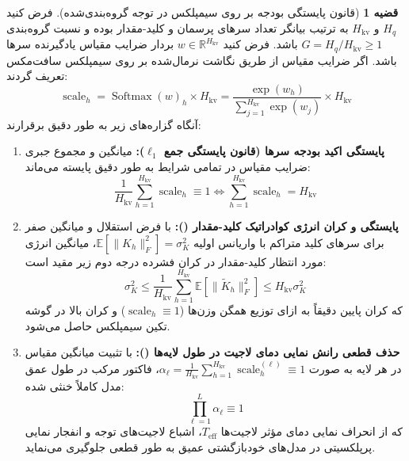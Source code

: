 \documentclass[12pt,a4paper]{report}
\theoremstyle{definition}
\newtheorem{theorem}{قضیه}[chapter]
\begin{document}
\begin{theorem}[قانون پایستگی بودجه بر روی سیمپلکس در توجه گروه‌بندی‌شده]
\label{thm:simplex_conservation_persian}
فرض کنید $H_q$ و $H_{\text{kv}}$ به ترتیب بیانگر تعداد سرهای پرسمان و کلید-مقدار بوده و نسبت گروه‌بندی $G = H_q / H_{\text{kv}} \ge 1$ باشد. فرض کنید $w \in \mathbb{R}^{H_{\text{kv}}}$ بردار ضرایب مقیاس یادگیرنده سرها باشد. اگر ضرایب مقیاس از طریق نگاشت نرمال‌شده بر روی سیمپلکس سافت‌مکس تعریف گردند:
\begin{equation}
    \operatorname{scale}_h = \operatorname{Softmax}(w)_h \times H_{\text{kv}} = \frac{\exp(w_h)}{\sum_{j=1}^{H_{\text{kv}}} \exp(w_j)} \times H_{\text{kv}}
\end{equation}
آنگاه گزاره‌های زیر به طور دقیق برقرارند:
\begin{enumerate}
    \item \textbf{پایستگی اکید بودجه سرها (قانون پایستگی جمع $\ell_1$):} میانگین و مجموع جبری ضرایب مقیاس در تمامی شرایط به طور دقیق پایسته می‌ماند:
    \begin{equation}
        \frac{1}{H_{\text{kv}}} \sum_{h=1}^{H_{\text{kv}}} \operatorname{scale}_h \equiv 1 \iff \sum_{h=1}^{H_{\text{kv}}} \operatorname{scale}_h = H_{\text{kv}}
    \end{equation}
    \item \textbf{پایستگی و کران انرژی کوادراتیک کلید-مقدار ():} با فرض استقلال و میانگین صفر برای سرهای کلید متراکم با واریانس اولیه $\mathbb{E}[\|K_h\|_F^2] = \sigma_K^2$، میانگین انرژی مورد انتظار کلید-مقدار در کران فشرده درجه دوم زیر مقید است:
    \begin{equation}
        \sigma_K^2 \le \frac{1}{H_{\text{kv}}} \sum_{h=1}^{H_{\text{kv}}} \mathbb{E}\left[\|\tilde{K}_h\|_F^2\right] \le H_{\text{kv}} \sigma_K^2
    \end{equation}
    که کران پایین دقیقاً به ازای توزیع همگن وزن‌ها ($\operatorname{scale}_h \equiv 1$) و کران بالا در گوشه تکین سیمپلکس حاصل می‌شود.
    \item \textbf{حذف قطعی رانش نمایی دمای لاجیت در طول لایه‌ها ():} با تثبیت میانگین مقیاس در هر لایه به صورت $\alpha_\ell = \frac{1}{H_{\text{kv}}} \sum_{h=1}^{H_{\text{kv}}} \operatorname{scale}_h^{(\ell)} \equiv 1$، فاکتور مرکب در طول عمق مدل کاملاً خنثی شده:
    \begin{equation}
        \prod_{\ell=1}^L \alpha_\ell \equiv 1
    \end{equation}
    که از انحراف نمایی دمای مؤثر لاجیت‌ها $T_{\text{eff}}$، اشباع لاجیت‌های توجه و انفجار نمایی پرپلکسیتی در مدل‌های خودبازگشتی عمیق به طور قطعی جلوگیری می‌نماید.
\end{enumerate}
\end{theorem}
\end{document}
